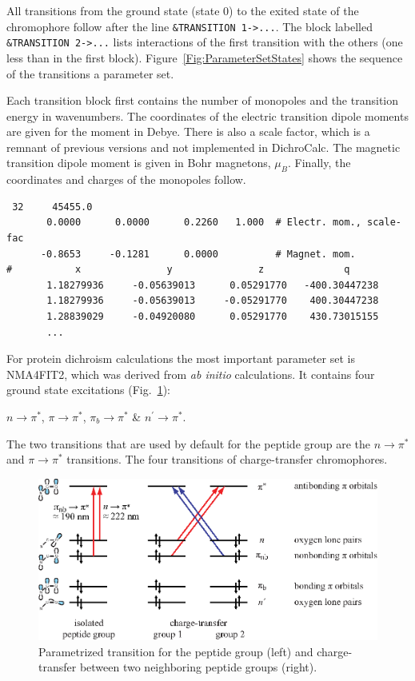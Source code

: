 \documentclass[11pt, letterpaper]{article}
\begin{document}
All transitions from the ground state (state 0) to the exited state of the chromophore follow after the line \verb'&TRANSITION 1->...'. The block labelled \verb'&TRANSITION 2->...' lists interactions of the first transition with the others (one less than in the first block). Figure~\ref{Fig:ParameterSetStates} shows the sequence of the transitions a parameter set.

Each transition block first contains the number of monopoles and the transition energy in wavenumbers. The coordinates of the electric transition dipole moments are given for the moment in Debye. There is also a scale factor, which is a remnant of previous versions and not implemented in DichroCalc. The magnetic transition dipole moment is given in Bohr magnetons, $\mu_B$. Finally, the coordinates and charges of the monopoles follow.

{\small
\begin{verbatim}
 32     45455.0
       0.0000      0.0000      0.2260   1.000  # Electr. mom., scale-fac
      -0.8653     -0.1281      0.0000          # Magnet. mom.
#           x               y               z              q
       1.18279936     -0.05639013      0.05291770   -400.30447238
       1.18279936     -0.05639013     -0.05291770    400.30447238
       1.28839029     -0.04920080      0.05291770    430.73015155
       ...
\end{verbatim}
}

For protein dichroism calculations the most important parameter set is NMA4FIT2, which was derived from \emph{ab initio} calculations.\cite{Besley:99:9636} It contains four ground state excitations (Fig.~\ref{Fig:AmideTransitions}):

$n \rightarrow \pi^*$, \hspace{3em}
$\pi \rightarrow \pi^*$, \hspace{3em}
$\pi_{b} \rightarrow \pi^*$
\hspace{3em} \& \hspace{3em}
$n^\prime \rightarrow \pi^*$.

The two transitions that are used by default for the peptide group are the $n\rightarrow\pi^*$ and $\pi\rightarrow\pi^*$ transitions. The four transitions of charge-transfer chromophores.\cite{Oakley:06:12414, Oakley:06:340, Bulheller:08:1866}

\begin{figure}
\centering
\includegraphics[width=12cm]{figures/amide-transitions.eps}
\caption{Parametrized transition for the peptide group (left) and charge-transfer between two neighboring peptide groups (right).}
\label{Fig:AmideTransitions}
\end{figure}
\end{document}
